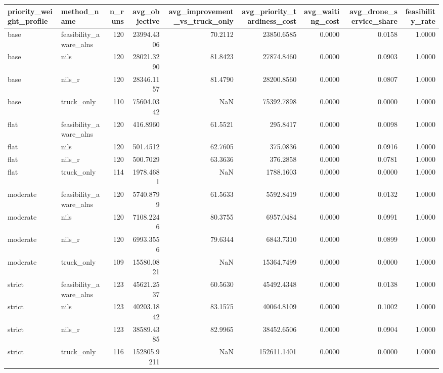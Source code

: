 \begin{tabular}{llrrrrrrr}
\toprule
priority_weight_profile & method_name & n_runs & avg_objective & avg_improvement_vs_truck_only & avg_priority_tardiness_cost & avg_waiting_cost & avg_drone_service_share & feasibility_rate \\
\midrule
base & feasibility_aware_alns & 120 & 23994.4306 & 70.2112 & 23850.6585 & 0.0000 & 0.0158 & 1.0000 \\
base & nils & 120 & 28021.3290 & 81.8423 & 27874.8460 & 0.0000 & 0.0903 & 1.0000 \\
base & nils_r & 120 & 28346.1157 & 81.4790 & 28200.8560 & 0.0000 & 0.0807 & 1.0000 \\
base & truck_only & 110 & 75604.0342 & NaN & 75392.7898 & 0.0000 & 0.0000 & 1.0000 \\
flat & feasibility_aware_alns & 120 & 416.8960 & 61.5521 & 295.8417 & 0.0000 & 0.0098 & 1.0000 \\
flat & nils & 120 & 501.4512 & 62.7605 & 375.0836 & 0.0000 & 0.0916 & 1.0000 \\
flat & nils_r & 120 & 500.7029 & 63.3636 & 376.2858 & 0.0000 & 0.0781 & 1.0000 \\
flat & truck_only & 114 & 1978.4681 & NaN & 1788.1603 & 0.0000 & 0.0000 & 1.0000 \\
moderate & feasibility_aware_alns & 120 & 5740.8799 & 61.5633 & 5592.8419 & 0.0000 & 0.0132 & 1.0000 \\
moderate & nils & 120 & 7108.2246 & 80.3755 & 6957.0484 & 0.0000 & 0.0991 & 1.0000 \\
moderate & nils_r & 120 & 6993.3556 & 79.6344 & 6843.7310 & 0.0000 & 0.0899 & 1.0000 \\
moderate & truck_only & 109 & 15580.0821 & NaN & 15364.7499 & 0.0000 & 0.0000 & 1.0000 \\
strict & feasibility_aware_alns & 123 & 45621.2537 & 60.5630 & 45492.4348 & 0.0000 & 0.0138 & 1.0000 \\
strict & nils & 123 & 40203.1842 & 83.1575 & 40064.8109 & 0.0000 & 0.1002 & 1.0000 \\
strict & nils_r & 123 & 38589.4385 & 82.9965 & 38452.6506 & 0.0000 & 0.0904 & 1.0000 \\
strict & truck_only & 116 & 152805.9211 & NaN & 152611.1401 & 0.0000 & 0.0000 & 1.0000 \\
\bottomrule
\end{tabular}
